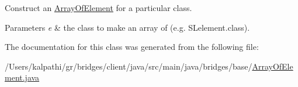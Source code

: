 Construct an \mbox{\hyperlink{classbridges_1_1base_1_1_array_of_element}{Array\+Of\+Element}} for a particular class. 
\begin{DoxyParams}{Parameters}
{\em e} & the class to make an array of (e.\+g. S\+Lelement.\+class). \\
\hline
\end{DoxyParams}


The documentation for this class was generated from the following file\+:\begin{DoxyCompactItemize}
\item 
/\+Users/kalpathi/gr/bridges/client/java/src/main/java/bridges/base/\mbox{\hyperlink{_array_of_element_8java}{Array\+Of\+Element.\+java}}\end{DoxyCompactItemize}
